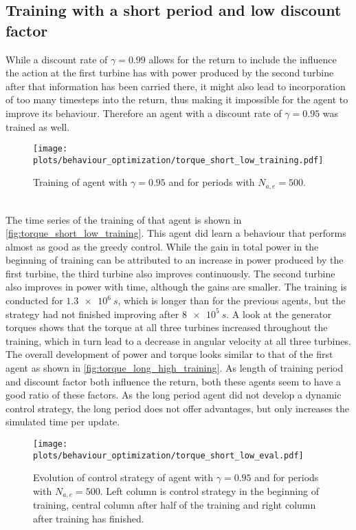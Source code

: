 \subsection{Training with a short period and low discount factor}
While a discount rate of $\gamma=0.99$ allows for the return to include the influence the action at the first turbine has with power produced by the second turbine after that information has been carried there, it might also lead to incorporation of too many timesteps into the return, thus making it impossible for the agent to improve its behaviour. Therefore an agent with a discount rate of $\gamma=0.95$ was trained as well.
\begin{figure}[h]
	\centering
	\texttt{[image: plots/behaviour\_optimization/torque\_short\_low\_training.pdf]}
	\caption{Training of agent with $\gamma=0.95$ and for periods with $N_{a,e}=500$.}
	\label{fig:torque_short_low_training}
\end{figure} \\
The time series of the training of that agent is shown in \autoref{fig:torque_short_low_training}. This agent did learn a behaviour that performs almost as good as the greedy control. While the gain in total power in the beginning of training can be attributed to an increase in power produced by the first turbine, the third turbine also improves continuously. The second turbine also improves in power with time, although the gains are smaller. The training is conducted for $\SI{1.3e6}{s}$, which is longer than for the previous agents, but the strategy had not finished improving after $\SI{8e5}{s}$. A look at the generator torques shows that the torque at all three turbines increased throughout the training, which in turn lead to a decrease in angular velocity at all three turbines. The overall development of power and torque looks similar to that of the first agent as shown in \autoref{fig:torque_long_high_training}. As length of training period and discount factor both influence the return, both these agents seem to have a good ratio of these factors. As the long period agent did not develop a dynamic control strategy, the long period does not offer advantages, but only increases the simulated time per update. 
\begin{figure}[h]
	\centering
	\texttt{[image: plots/behaviour\_optimization/torque\_short\_low\_eval.pdf]}
	\caption{Evolution of control strategy of agent with $\gamma=0.95$ and for periods with $N_{a,e}=500$. Left column is control strategy in the beginning of training, central column after half of the training and right column after training has finished.}
	\label{fig:torque_short_low_eval}
\end{figure} \\
